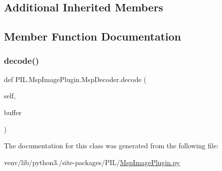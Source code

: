 \subsection*{Additional Inherited Members}


\subsection{Member Function Documentation}
\mbox{\label{classPIL_1_1MspImagePlugin_1_1MspDecoder_a68374ed831537ec932b07aca4179fcb7}} 
\subsubsection{\texorpdfstring{decode()}{decode()}}
{\footnotesize\ttfamily def P\+I\+L.\+Msp\+Image\+Plugin.\+Msp\+Decoder.\+decode (\begin{DoxyParamCaption}\item[{}]{self,  }\item[{}]{buffer }\end{DoxyParamCaption})}



The documentation for this class was generated from the following file\+:\begin{DoxyCompactItemize}
\item 
venv/lib/python3./site-\/packages/\+P\+I\+L/\hyperlink{MspImagePlugin_8py}{Msp\+Image\+Plugin.\+py}\end{DoxyCompactItemize}

